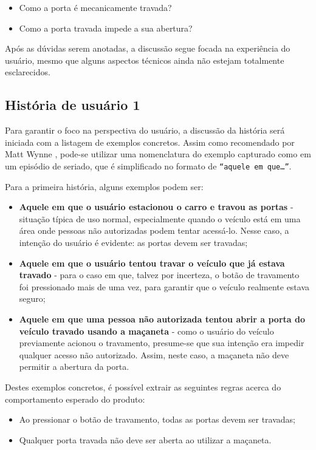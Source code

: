\begin{itemize}
    \item Como a porta é mecanicamente travada?
    \item Como a porta travada impede a sua abertura?
\end{itemize}

Após as dúvidas serem anotadas, a discussão segue focada na experiência do usuário, mesmo que alguns aspectos técnicos ainda não estejam totalmente esclarecidos.

\subsection{História de usuário 1}
\label{sbs:historia1}
Para garantir o foco na perspectiva do usuário, a discussão da história será iniciada com a listagem de exemplos concretos. Assim como recomendado por 
Matt Wynne \cite{cucumberExampleMapping}, pode-se utilizar uma nomenclatura do exemplo capturado como em um episódio de seriado, que é simplificado 
no formato de \texttt{``aquele em que…''}.

Para a primeira história, alguns exemplos podem ser:

\begin{itemize}
    \item \textbf{Aquele em que o usuário estacionou o carro e travou as portas} - situação típica de uso normal, especialmente quando o veículo está em uma área onde pessoas não autorizadas podem tentar acessá-lo. Nesse caso, a intenção do usuário é evidente: as portas devem ser travadas;
    \item \textbf{Aquele em que o usuário tentou travar o veículo que já estava travado} - para o caso em que, talvez por incerteza, o botão de travamento foi pressionado mais de uma vez, para garantir que o veículo realmente estava seguro;
    \item \textbf{Aquele em que uma pessoa não autorizada tentou abrir a porta do veículo travado usando a maçaneta} - como o usuário do veículo previamente acionou o travamento, presume-se que sua intenção era impedir qualquer acesso não autorizado. Assim, neste caso, a maçaneta não deve permitir a abertura da porta.
\end{itemize}

Destes exemplos concretos, é possível extrair as seguintes regras acerca do comportamento esperado do produto:

\begin{itemize}
    \item Ao pressionar o botão de travamento, todas as portas devem ser travadas;
    \item Qualquer porta travada não deve ser aberta ao utilizar a maçaneta.
\end{itemize}

